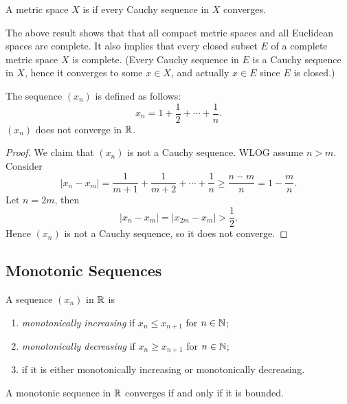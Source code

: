 \begin{definition}
A metric space $X$ is  if every Cauchy sequence in $X$ converges.
\end{definition}

\begin{remark}
The above result shows that that all compact metric spaces and all Euclidean spaces are complete. It also implies that every closed subset $E$ of a complete metric space $X$ is complete. (Every Cauchy sequence in $E$ is a Cauchy sequence in $X$, hence it converges to some $x\in X$, and actually $x\in E$ since $E$ is closed.)
\end{remark}

\begin{example}
The sequence $(x_n)$ is defined as follows:
\[x_n=1+\frac{1}{2}+\cdots+\frac{1}{n}.\]
$(x_n)$ does not converge in $\mathbb R$.
\begin{proof}
We claim that $(x_n)$ is not a Cauchy sequence. WLOG assume $n>m$. Consider
\[|x_n-x_m|=\frac{1}{m+1}+\frac{1}{m+2}+\cdots+\frac{1}{n}\ge\frac{n-m}{n}=1-\frac{m}{n}.\]
Let $n=2m$, then
\[|x_n-x_m|=|x_{2m}-x_m|>\frac{1}{2}.\]
Hence $(x_n)$ is not a Cauchy sequence, so it does not converge.
\end{proof}
\end{example}
\pagebreak

\subsection{Monotonic Sequences}
\begin{definition}
A sequence $(x_n)$ in $\mathbb R$ is
\begin{enumerate}[label=(\roman*)]
\item \emph{monotonically increasing} if $x_n\le x_{n+1}$ for $n\in\mathbb N$;
\item \emph{monotonically decreasing} if $x_n\ge x_{n+1}$ for $n\in\mathbb N$;
\item {} if it is either monotonically increasing or monotonically decreasing.
\end{enumerate}
\end{definition}

\begin{lemma}
A monotonic sequence in $\mathbb R$ converges if and only if it is bounded.
\end{lemma}

